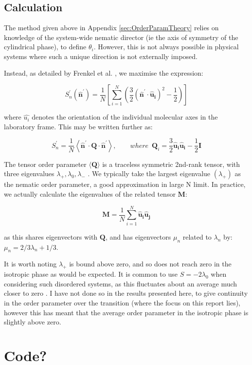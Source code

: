 \documentclass[11pt, a4paper]{article} %
\begin{document}
\begin{appendices}
\subsection{Calculation}\label{sec:OrderParamCalc}
The method given above in Appendix \ref{sec:OrderParamTheory} relies on knowledge of the system-wide nematic director (ie the axis of symmetry of the cylindrical phase), to define $\theta_{i}$. However, this is not always possible in physical systems where such a unique direction is not externally imposed.

Instead, as detailed by Frenkel et al. \cite{Frenkel1985}, we maximise the expression:

\begin{equation}
S^{\prime}_{n}(\boldsymbol{\hat{n}^{\prime}}) = \frac{1}{N} \left[ \sum_{i=1}^{N} \left( \frac{3}{2} (\boldsymbol{\hat{n}^{\prime}} \cdot \boldsymbol{\hat{u}_{i}})^{2}-\frac{1}{2} \right) \right]
\end{equation}

where $\hat{u_{i}}$ denotes the orientation of the individual molecular axes in the laboratory frame. This may be written further as:

\begin{equation}
S^{\prime}_{n} = \frac{1}{N} \left\langle \boldsymbol{\hat{n}^{\prime}} \cdot \textbf{Q} \cdot \boldsymbol{\hat{n}^{\prime}}  \right\rangle, \qquad where \enspace \textbf{Q}_{i} = \frac{3}{2} \boldsymbol{\hat{u}_{i}}\boldsymbol{\hat{u}_{i}}-\frac{1}{2}\textbf{I}
\end{equation}

The tensor order parameter $\langle \textbf{Q} \rangle$ is a traceless symmetric 2nd-rank tensor, with three eigenvalues $\lambda_{+}, \lambda_{0}, \lambda_{-}$ \cite{Eppenga1984}. We typically take the largest eigenvalue $(\lambda_{+})$ as the nematic order parameter, a good approximation in large N limit.
In practice, we actually calculate the eigenvalues of the related tensor $\textbf{M}$:

\begin{equation}
\textbf{M} =  \frac{1}{N} \sum_{i=1}^{N} \boldsymbol{\hat{u}_{i}}\boldsymbol{\hat{u}_{j}}
\end{equation}

as this shares eigenvectors with $\textbf{Q}$, and has eigenvectors $\mu_{n}$ related to $\lambda_{n}$ by: $\mu_{n} = 2/3 \lambda_{n} + 1/3$.

It is worth noting $\lambda_{+}$ is bound above zero, and so does not reach zero in the isotropic phase as would be expected. It is common to use $S =  -2\lambda_{0}$ when considering such disordered systems, as this fluctuates about an average much closer to zero \cite{Mountain1977}. I have not done so in the results presented here, to give continuity in the order parameter over the transition (where the focus on this report lies), however this has meant that the average order parameter in the isotropic phase is slightly above zero.


\section{Code?}

\end{appendices}
\end{document}
